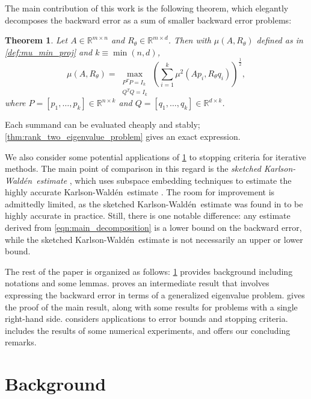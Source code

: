 \documentclass{article}
\newtheorem{theorem}{Theorem}
\newcommand{\tr}{\operatorname{tr}}
\newcommand{\ts}{^T}
\newcommand{\Rtheta}{R_{\theta}}
\DeclareMathOperator{\Diag}{diag}
\newcommand{\KW}{Karlson-Wald\'{e}n~}
\begin{document}
The main contribution of this work is the following theorem, which elegantly decomposes the backward error as a sum of smaller backward error problems:

\begin{theorem}\label{thm:main_decomposition}
    Let $A \in \mathbb{R}^{m\times n}$ and $\Rtheta\in \mathbb{R}^{m\times d}$. Then with $\mu(A,\Rtheta)$ defined as in \cref{def:mu_min_proj} and $k\equiv \min(n, d)$,
    \begin{equation}\label{eqn:main_decomposition}
        \mu(A,R_\theta) = \max_{\substack{P\ts P = I_{k}\\ Q\ts Q = I_{k}}}\left(\sum_{i=1}^{k}\mu^2(Ap_i, R_\theta q_i)\right)^{\frac{1}{2}},
    \end{equation}
    where $P = [p_1,\ldots, p_{k}]\in \mathbb{R}^{n\times k}$ and $Q=[q_1,\ldots,q_k]\in \mathbb{R}^{d\times k}$. 
\end{theorem}
Each summand can be evaluated cheaply and stably; \cref{thm:rank_two_eigenvalue_problem} gives an exact expression.

We also consider some potential applications of \cref{thm:main_decomposition} to stopping criteria for iterative methods. The main point of comparison in this regard is the {\em sketched \KW estimate} \cite{epperly2026fast}, which uses subspace embedding techniques to estimate the highly accurate \KW estimate \cite{karlson1997estimation, gratton2012accuracy}. The room for improvement is admittedly limited, as the sketched \KW estimate was found in \cite{epperly2026fast} to be highly accurate in practice. Still, there is one notable difference: any estimate derived from \cref{eqn:main_decomposition} is a lower bound on the backward error, while the sketched \KW estimate is not necessarily an upper or lower bound. 


The rest of the paper is organized as follows: \cref{sec:background} provides background including notations and some lemmas.  proves an intermediate result that involves expressing the backward error in terms of a generalized eigenvalue problem.  gives the proof of the main result, along with some results for problems with a single right-hand side.  considers applications to error bounds and stopping criteria.  includes the results of some numerical experiments, and  offers our concluding remarks.

\section{Background}\label{sec:background}
\end{document}
